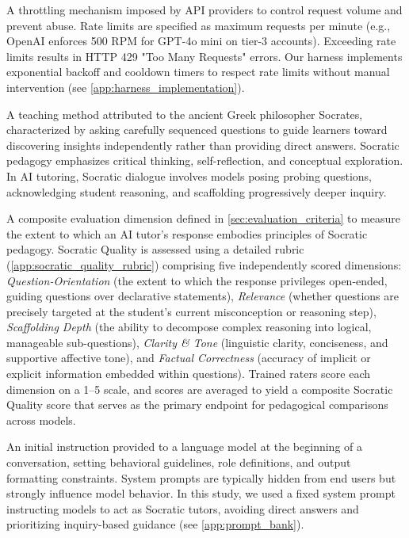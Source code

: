 \begin{description}[style=nextline,leftmargin=0em,itemsep=1em]
\item[\textbf{Rate Limiting}] A throttling mechanism imposed by API providers to control request volume and prevent abuse. Rate limits are specified as maximum requests per minute (e.g., OpenAI enforces 500 RPM for GPT-4o mini on tier-3 accounts). Exceeding rate limits results in HTTP 429 "Too Many Requests" errors. Our harness implements exponential backoff and cooldown timers to respect rate limits without manual intervention (see \cref{app:harness_implementation}).

\item[\textbf{Socratic Dialogue}] A teaching method attributed to the ancient Greek philosopher Socrates, characterized by asking carefully sequenced questions to guide learners toward discovering insights independently rather than providing direct answers. Socratic pedagogy emphasizes critical thinking, self-reflection, and conceptual exploration. In AI tutoring, Socratic dialogue involves models posing probing questions, acknowledging student reasoning, and scaffolding progressively deeper inquiry.

\item[\textbf{Socratic Quality}] A composite evaluation dimension defined in \cref{sec:evaluation_criteria} to measure the extent to which an AI tutor's response embodies principles of Socratic pedagogy. Socratic Quality is assessed using a detailed rubric (\cref{app:socratic_quality_rubric}) comprising five independently scored dimensions: \textit{Question-Orientation} (the extent to which the response privileges open-ended, guiding questions over declarative statements), \textit{Relevance} (whether questions are precisely targeted at the student's current misconception or reasoning step), \textit{Scaffolding Depth} (the ability to decompose complex reasoning into logical, manageable sub-questions), \textit{Clarity \& Tone} (linguistic clarity, conciseness, and supportive affective tone), and \textit{Factual Correctness} (accuracy of implicit or explicit information embedded within questions). Trained raters score each dimension on a 1--5 scale, and scores are averaged to yield a composite Socratic Quality score that serves as the primary endpoint for pedagogical comparisons across models.

\item[\textbf{System Prompt}] An initial instruction provided to a language model at the beginning of a conversation, setting behavioral guidelines, role definitions, and output formatting constraints. System prompts are typically hidden from end users but strongly influence model behavior. In this study, we used a fixed system prompt instructing models to act as Socratic tutors, avoiding direct answers and prioritizing inquiry-based guidance (see \cref{app:prompt_bank}).


\end{description}
